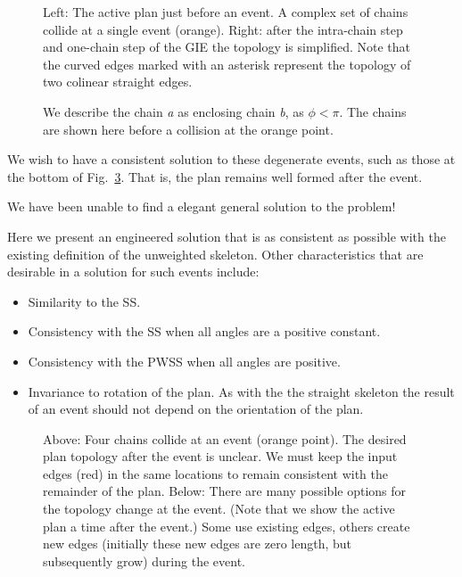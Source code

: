 \begin{figure}
  \centering
  \def\svgwidth{1.0\columnwidth}
  
  \caption[A point degeneracy]{\label{fig:wss_example_topology} Left: The active plan just before an event. A complex set of chains collide at a single event (orange). Right: after the intra-chain step and one-chain step of the GIE the topology is simplified. Note that the curved edges marked with an asterisk represent the topology of two colinear straight edges.}
\end{figure}

\begin{figure}
  \centering
  \def\svgwidth{0.4\columnwidth}
  
  \caption[Enclosing chains]{\label{fig:wss_enclosing_chain} We describe the chain \emph{a} as enclosing chain \emph{b}, as $\phi < \pi$. The chains are shown here before a collision at the orange point.}
\end{figure}

We wish to have a consistent solution to these degenerate events, such as those at the bottom of Fig.~\ref{fig:wss_options}. That is, the plan remains well formed after the event. 

We have been unable to find a elegant general solution to the problem!

Here we present an engineered solution that is as consistent as possible with the existing definition of the unweighted skeleton. Other characteristics that are desirable in a solution for such events include:
\begin{itemize}
\item{Similarity to the SS.}
\item{Consistency with the SS when all angles are a positive constant.}
\item{Consistency with the PWSS when all angles are positive.}
\item{Invariance to rotation of the plan. As with the the straight skeleton the result of an event should not depend on the orientation of the plan.}
\end{itemize}
 
\begin{figure}
  \centering
  \def\svgwidth{1.0\columnwidth}
  
  \caption[Several solutions to the MWSS]{\label{fig:wss_options}Above: Four chains collide at an event (orange point). The desired plan topology after the event is unclear. We must keep the input edges (red) in the same locations to remain consistent with the remainder of the plan. Below: There are many possible options for the topology change at the event. (Note that we show the active plan a time after the event.) Some use existing edges, others create new edges (initially these new edges are zero length, but subsequently grow) during the event.}
\end{figure}

